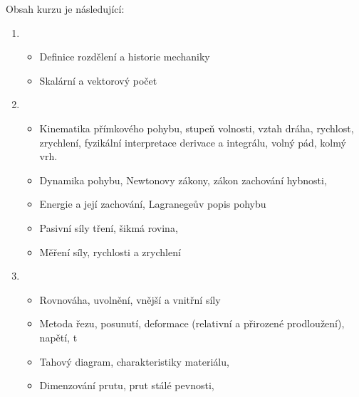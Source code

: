 \documentclass[letterpaper,10pt,english]{jupyterBook}
\begin{document}
\sphinxAtStartPar
Obsah kurzu je následující:
\begin{enumerate}
%
\setcounter{enumi}{-1}
\item {} 
\sphinxAtStartPar
{}
\begin{itemize}
\item {} 
\sphinxAtStartPar
Definice rozdělení a historie mechaniky

\item {} 
\sphinxAtStartPar
Skalární a vektorový počet

\end{itemize}

\item {} 
\sphinxAtStartPar
{}
\begin{itemize}
\item {} 
\sphinxAtStartPar
Kinematika přímkového pohybu, stupeň volnosti, vztah dráha, rychlost, zrychlení, fyzikální interpretace derivace a integrálu, volný pád, kolmý vrh.

\item {} 
\sphinxAtStartPar
Dynamika pohybu, Newtonovy zákony, zákon zachování hybnosti,

\item {} 
\sphinxAtStartPar
Energie a její zachování, Lagranegeův popis pohybu

\item {} 
\sphinxAtStartPar
Pasivní síly \sphinxhyphen{} tření, šikmá rovina,

\item {} 
\sphinxAtStartPar
Měření síly, rychlosti a zrychlení

\end{itemize}

\item {} 
\sphinxAtStartPar
{}
\begin{itemize}
\item {} 
\sphinxAtStartPar
Rovnováha, uvolnění, vnější a vnitřní síly

\item {} 
\sphinxAtStartPar
Metoda řezu, posunutí, deformace (relativní a přirozené prodloužení), napětí, t

\item {} 
\sphinxAtStartPar
Tahový diagram, charakteristiky materiálu,

\item {} 
\sphinxAtStartPar
Dimenzování prutu, prut stálé pevnosti,


\end{itemize}
\end{enumerate}
\end{document}

